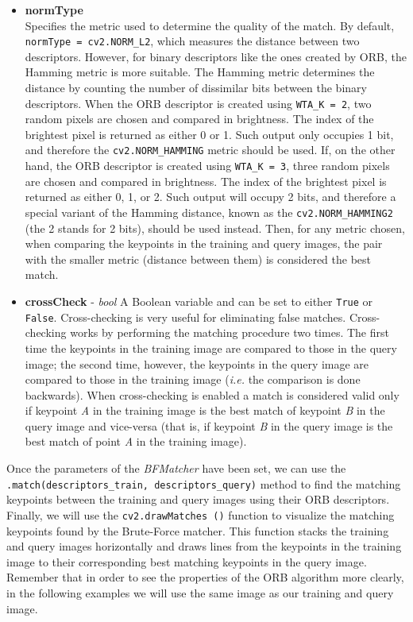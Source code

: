 \documentclass[11pt]{article}
\begin{document}
\begin{itemize}
\item
  \textbf{normType}\\
  Specifies the metric used to determine the quality of the match. By
  default, \texttt{normType\ =\ cv2.NORM\_L2}, which measures the
  distance between two descriptors. However, for binary descriptors like
  the ones created by ORB, the Hamming metric is more suitable. The
  Hamming metric determines the distance by counting the number of
  dissimilar bits between the binary descriptors. When the ORB
  descriptor is created using \texttt{WTA\_K\ =\ 2}, two random pixels
  are chosen and compared in brightness. The index of the brightest
  pixel is returned as either 0 or 1. Such output only occupies 1 bit,
  and therefore the \texttt{cv2.NORM\_HAMMING} metric should be used.
  If, on the other hand, the ORB descriptor is created using
  \texttt{WTA\_K\ =\ 3}, three random pixels are chosen and compared in
  brightness. The index of the brightest pixel is returned as either 0,
  1, or 2. Such output will occupy 2 bits, and therefore a special
  variant of the Hamming distance, known as the
  \texttt{cv2.NORM\_HAMMING2} (the 2 stands for 2 bits), should be used
  instead. Then, for any metric chosen, when comparing the keypoints in
  the training and query images, the pair with the smaller metric
  (distance between them) is considered the best match.
\item
  \textbf{crossCheck} - \emph{bool} A Boolean variable and can be set to
  either \texttt{True} or \texttt{False}. Cross-checking is very useful
  for eliminating false matches. Cross-checking works by performing the
  matching procedure two times. The first time the keypoints in the
  training image are compared to those in the query image; the second
  time, however, the keypoints in the query image are compared to those
  in the training image (\emph{i.e.} the comparison is done backwards).
  When cross-checking is enabled a match is considered valid only if
  keypoint \emph{A} in the training image is the best match of keypoint
  \emph{B} in the query image and vice-versa (that is, if keypoint
  \emph{B} in the query image is the best match of point \emph{A} in the
  training image).
\end{itemize}

Once the parameters of the \emph{BFMatcher} have been set, we can use
the \texttt{.match(descriptors\_train,\ descriptors\_query)} method to
find the matching keypoints between the training and query images using
their ORB descriptors. Finally, we will use the
\texttt{cv2.drawMatches\ ()} function to visualize the matching
keypoints found by the Brute-Force matcher. This function stacks the
training and query images horizontally and draws lines from the
keypoints in the training image to their corresponding best matching
keypoints in the query image. Remember that in order to see the
properties of the ORB algorithm more clearly, in the following examples
we will use the same image as our training and query image.
\end{document}
